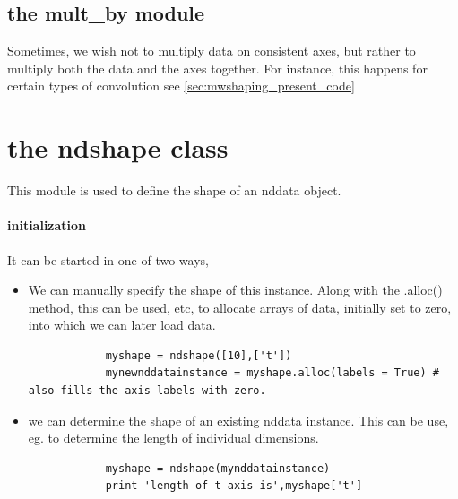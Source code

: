 \subsection{the mult\_by module}
Sometimes, we wish not to multiply data on consistent axes,
    but rather to multiply both the data and the axes together.
For instance, this happens for certain types of convolution
    see \ref{sec:mwshaping_present_code}
\section{the ndshape class}
This module is used to define the shape of an nddata object.
\paragraph{initialization}
It can be started in one of two ways,
\begin{itemize}
    \item We can manually specify the shape of this instance.
        Along with the .alloc() method, this can be used, etc, to allocate arrays of data, initially set to zero, into which we can later load data.
        \begin{lstlisting}
            myshape = ndshape([10],['t'])
            mynewnddatainstance = myshape.alloc(labels = True) # also fills the axis labels with zero.
        \end{lstlisting}
    \item we can determine the shape of an existing nddata instance.
        This can be use, eg. to determine the length of individual dimensions.
        \begin{lstlisting}
            myshape = ndshape(mynddatainstance)
            print 'length of t axis is',myshape['t']
        \end{lstlisting}
\end{itemize}
